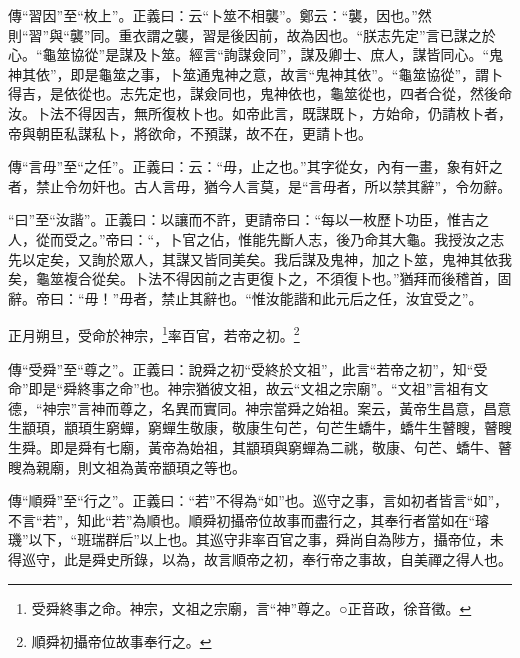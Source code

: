 {\noindent\zhuan{}\fzbyks 傳“習因”至“枚上”。正義曰：云“卜筮不相襲”。鄭云：“襲，因也。”然則“習”與“襲”同。重衣謂之襲，習是後因前，故為因也。“朕志先定”言已謀之於心。“龜筮協從”是謀及卜筮。經言“詢謀僉同”，謀及卿士、庶人，謀皆同心。“鬼神其依”，即是龜筮之事，卜筮通鬼神之意，故言“鬼神其依”。“龜筮協從”，謂卜得吉，是依從也。志先定也，謀僉同也，鬼神依也，龜筮從也，四者合從，然後命汝。卜法不得因吉，無所復枚卜也。如帝此言，既謀既卜，方始命，仍請枚卜者，帝與朝臣私謀私卜，將欲命，不預謀，故不在，更請卜也。 \par}

{\noindent\zhuan{}\fzbyks 傳“言毋”至“之任”。正義曰：云：“毋，止之也。”其字從女，內有一畫，象有奸之者，禁止令勿奸也。古人言毋，猶今人言莫，是“言毋者，所以禁其辭”，令勿辭。 \par}

{\noindent\shu{}\fzkt “曰”至“汝諧”。正義曰：以讓而不許，更請帝曰：“每以一枚歷卜功臣，惟吉之人，從而受之。”帝曰：“，卜官之佔，惟能先斷人志，後乃命其大龜。我授汝之志先以定矣，又詢於眾人，其謀又皆同美矣。我后謀及鬼神，加之卜筮，鬼神其依我矣，龜筮複合從矣。卜法不得因前之吉更復卜之，不須復卜也。”猶拜而後稽首，固辭。帝曰：“毋！”毋者，禁止其辭也。“惟汝能諧和此元后之任，汝宜受之”。 \par}


正月朔旦，受命於神宗，\footnote{受舜終事之命。神宗，文祖之宗廟，言“神”尊之。○正音政，徐音徵。}率百官，若帝之初。\footnote{順舜初攝帝位故事奉行之。}

{\noindent\zhuan{}\fzbyks 傳“受舜”至“尊之”。正義曰：說舜之初“受終於文祖”，此言“若帝之初”，知“受命”即是“舜終事之命”也。神宗猶彼文祖，故云“文祖之宗廟”。“文祖”言祖有文德，“神宗”言神而尊之，名異而實同。神宗當舜之始祖。案云，黃帝生昌意，昌意生顓頊，顓頊生窮蟬，窮蟬生敬康，敬康生句芒，句芒生蟜牛，蟜牛生瞽瞍，瞽瞍生舜。即是舜有七廟，黃帝為始祖，其顓頊與窮蟬為二祧，敬康、句芒、蟜牛、瞽瞍為親廟，則文祖為黃帝顓頊之等也。 \par}

{\noindent\zhuan{}\fzbyks 傳“順舜”至“行之”。正義曰：“若”不得為“如”也。巡守之事，言如初者皆言“如”，不言“若”，知此“若”為順也。順舜初攝帝位故事而盡行之，其奉行者當如在“璿璣”以下，“班瑞群后”以上也。其巡守非率百官之事，舜尚自為陟方，攝帝位，未得巡守，此是舜史所錄，以為，故言順帝之初，奉行帝之事故，自美禪之得人也。 \par}

